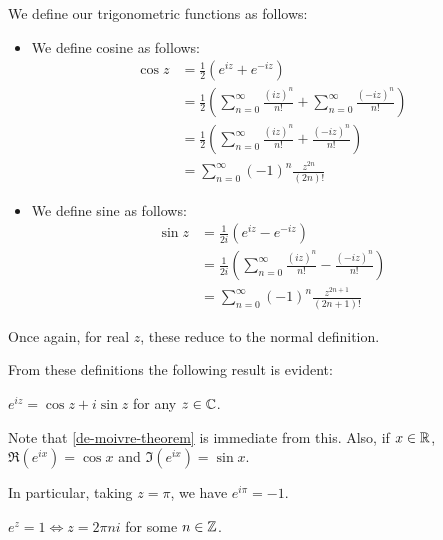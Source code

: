 \documentclass{../template/note}
\begin{document}
    \begin{definition} We define our trigonometric functions as follows:
        
        
        \begin{itemize}
            \item We define cosine as follows:
            \begin{align*}
                \cos z &= \frac 1 2 (e^{iz}+e^{-iz}) \\
                &= \frac 1 2 \left(\sum_{n=0}^\infty \frac{(iz)^n}{n!} + \sum_{n=0}^\infty \frac{(-iz)^n}{n!} \right) \\
                &= \frac 1 2 \left(\sum_{n=0}^\infty \frac{(iz)^n}{n!} + \frac{(-iz)^n}{n!} \right) \\
                &= \sum_{n=0}^\infty (-1)^n \frac{z^{2n}}{(2n)!}
            \end{align*}
            \item We define sine as follows:
            \begin{align*}
                \sin z &= \frac 1 {2i} (e^{iz}-e^{-iz}) \\
                &= \frac 1 {2i} \left(\sum_{n=0}^\infty \frac{(iz)^n}{n!} - \frac{(-iz)^n}{n!} \right) \\
                &= \sum_{n=0}^\infty (-1)^n \frac{z^{2n+1}}{(2n+1)!}
            \end{align*}
        \end{itemize}
        
        
    \end{definition}
    
    Once again, for real \(z\), these reduce to the normal definition.

    From these definitions the following result is evident:
    
    \begin{theorem}
        \(e^{iz} = \cos z + i \sin z\) for any \(z \in \mathbb C\).
    \end{theorem}

    Note that \cref{de-moivre-theorem} is immediate from this. Also, if \(x \in \mathbb R\), \(\Re(e^{ix}) = \cos x\) and \(\Im(e^{ix}) = \sin x\).

    \begin{corollary}
        In particular, taking \(z = \pi\), we have \(e^{i \pi} = -1\).
    \end{corollary}

    \begin{lemma}
        \(e^z = 1 \iff z = 2\pi n i\) for some \(n \in \mathbb Z\).
    \end{lemma}
    
\end{document}
